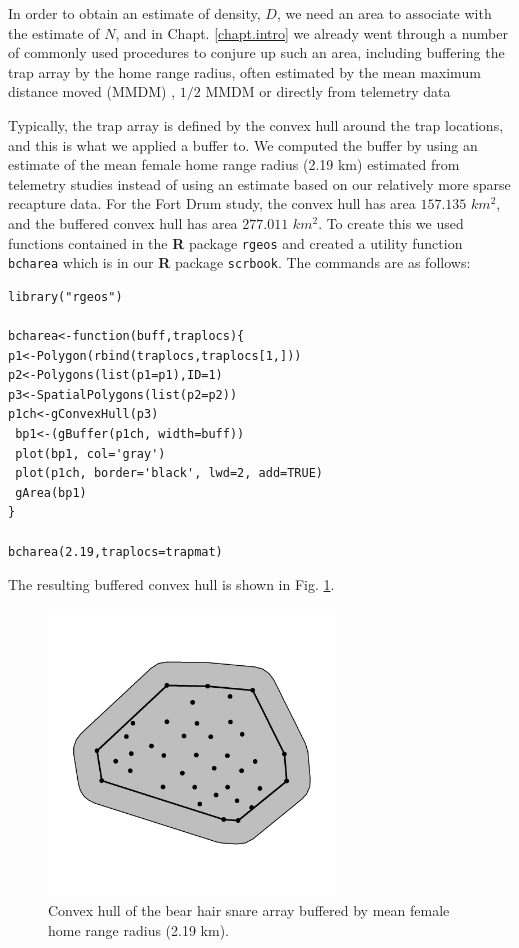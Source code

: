 In order to obtain an estimate of density, $D$, we need an area to
associate with the estimate of $N$,  and in Chapt. \ref{chapt.intro} we already 
went through a number of commonly used procedures to
conjure up such an area, including buffering the trap array by the home
range radius, often estimated by the mean maximum distance moved
(MMDM) \citep{parmenter_etal:2003},
$1/2$ MMDM \citep{dice:1938} or
directly from telemetry data \citep{wallace_etal:2003}

Typically, the trap
array is defined by the convex hull around the trap locations, and
this is what we applied a buffer to. We computed the buffer by using
an estimate of the mean female home range radius (2.19 km) estimated from
telemetry studies \citep{bales_etal:2005} instead of using an estimate
based on our relatively more sparse recapture data.
 For the Fort Drum study, the convex hull has area
$157.135$ $km^2$, and the buffered convex hull has area $277.011$
$km^2$.
To create this we used functions contained in the {\bf R} package
\mbox{\tt rgeos} and created a utility function \mbox{\tt bcharea}
which is in our {\bf R} package \mbox{\tt scrbook}. The commands are
as follows:
\begin{verbatim}
library("rgeos")

bcharea<-function(buff,traplocs){
p1<-Polygon(rbind(traplocs,traplocs[1,]))
p2<-Polygons(list(p1=p1),ID=1)
p3<-SpatialPolygons(list(p2=p2))
p1ch<-gConvexHull(p3)
 bp1<-(gBuffer(p1ch, width=buff))
 plot(bp1, col='gray')
 plot(p1ch, border='black', lwd=2, add=TRUE)
 gArea(bp1)
}

bcharea(2.19,traplocs=trapmat)
\end{verbatim}
The resulting buffered convex hull is shown in Fig. \ref{closed.fig.bch}.
\begin{figure}
\begin{center}
\includegraphics[height=3in,width=3in]{Ch3/figs/bufferedCH}
\end{center}
\caption{Convex hull of the bear hair snare array buffered by mean female
home range radius (2.19 km).}
\label{closed.fig.bch}
\end{figure}

